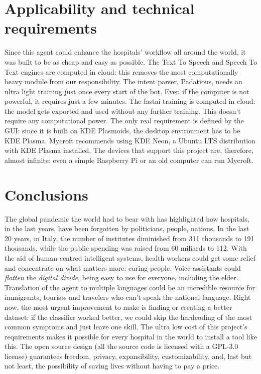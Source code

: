 \documentclass[conference]{IEEEtran}
\begin{document}
\section{Applicability and technical requirements}
\label{sec:applicability}
Since this agent could enhance the hospitals' workflow all around the world, it was built to be as cheap and easy as possible. The Text To Speech and Speech To Text engines are computed in cloud: this removes the most computationally heavy module from our responsibility. The intent parser, Padatious, needs an ultra light training just once every start of the bot. Even if the computer is not powerful, it requires just a few minutes. The fastai training is computed in cloud: the model gets exported and used without any further training. This doesn't require any computational power. The only real requirement is defined by the GUI: since it is built on KDE Plasmoids, the desktop environment has to be KDE Plasma. Mycroft recommends using KDE Neon, a Ubuntu LTS distribution with KDE Plasma installed. The devices that support this project are, therefore, almost infinite: even a simple Raspberry Pi or an old computer can run Mycroft.
\section{Conclusions}
\label{sec:conclusions}
The global pandemic the world had to bear with has highlighted how hospitals, in the last years, have been forgotten by politicians, people, nations. In the last 20 years, in Italy, the number of institutes diminished from 311 thousands to 191 thousands, while the public spending was raised from 60 miliards to 112\cite{ospedali-agi}. With the aid of human-centred intelligent systems, health workers could get some relief and concentrate on what matters more: curing people. Voice assistants could \textit{flatten} the
\textit{digital divide}, being easy to use for everyone, including the elder. Translation of the agent to multiple languages could be an incredible resource for immigrants, tourists and travelers who can't speak the national language. Right now, the most urgent improvement to make is finding or creating a better dataset: if the classifier worked better, we could skip the hardcoding of the most common symptoms and just leave one skill. The ultra low cost of this project's requirements makes it possible for every hospital in the world to install a tool like this. The open source design (all the source code is licensed with a GPL-3.0 license) guarantees freedom, privacy, expansibility, customizability, and, last but not least, the possibility of saving lives without having to pay a price.
\end{document}

